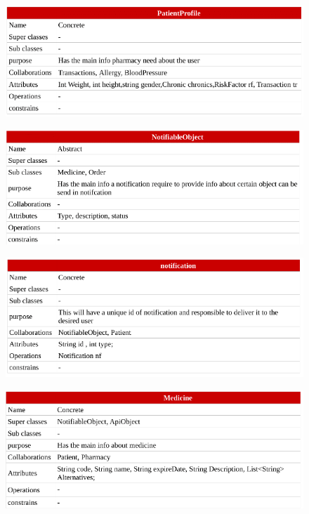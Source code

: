 \documentclass[]{article}
\begin{document}
\begin{figure}[H]
\centering
\includegraphics[scale=0.4]{./classdiagram/description/05}
\end{figure}
\begin{figure}[H]
\centering
\includegraphics[scale=0.4]{./classdiagram/description/06}
\end{figure}

\begin{figure}[H]
\centering
\includegraphics[scale=0.4]{./classdiagram/description/07}
\end{figure}

\begin{figure}[H]
\centering
\includegraphics[scale=0.4]{./classdiagram/description/08}
\end{figure}
\end{document}
